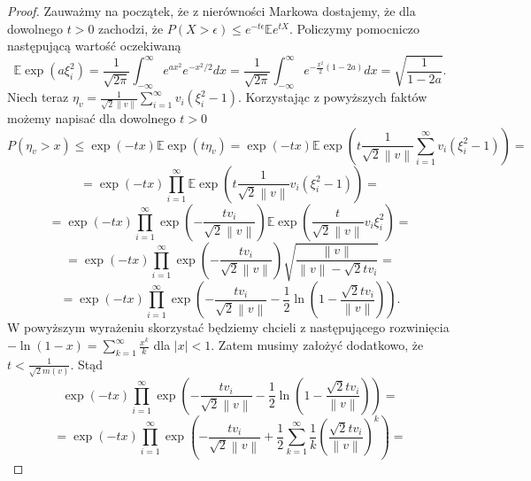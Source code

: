 \documentclass{article}
\newcommand{\norm}[1]{\left\lVert#1\right\rVert}
\begin{document}
\begin{proof}
Zauważmy na początek, że z nierówności Markowa dostajemy, że dla dowolnego $t>0$ zachodzi, że $P(X>\epsilon)\leq e^{-t\epsilon}\mathbb{E}e^{tX}$. Policzymy pomocniczo następującą wartość oczekiwaną
\begin{displaymath}
\mathbb{E}\exp (a\xi_i^2)=\frac{1}{\sqrt{2\pi}}\int_{-\infty}^{\infty}e^{ax^2}e^{-x^2/2}dx=\frac{1}{\sqrt{2\pi}}\int_{-\infty}^{\infty}e^{-\frac{x^2}{2}(1-2a)}dx=\sqrt{\frac{1}{1-2a}}.
\end{displaymath}
Niech teraz $\eta_v=\frac{1}{\sqrt{2}\norm{v}}\sum_{i=1}^{\infty}v_i(\xi_i^2-1)$. Korzystając z powyższych faktów możemy napisać dla dowolnego $t>0$
\begin{displaymath}
P(\eta_v>x)\leq \exp(-tx)\mathbb{E}\exp(t\eta_v)=\exp(-tx)\mathbb{E}\exp\left(t\frac{1}{\sqrt{2}\norm{v}}\sum_{i=1}^{\infty}v_i(\xi_i^2-1)\right)=
\end{displaymath}
\begin{displaymath}
=\exp(-tx)\prod_{i=1}^{\infty}\mathbb{E}\exp\left(t\frac{1}{\sqrt{2}\norm{v}}v_i(\xi_i^2-1)\right)=
\end{displaymath}
\begin{displaymath}
=\exp(-tx)\prod_{i=1}^{\infty}\exp\left(-\frac{tv_i}{\sqrt{2}\norm{v}}\right)\mathbb{E}\exp\left(\frac{t}{\sqrt{2}\norm{v}}v_i\xi_i^2\right)=
\end{displaymath}
\begin{displaymath}
=\exp(-tx)\prod_{i=1}^{\infty}\exp\left(-\frac{tv_i}{\sqrt{2}\norm{v}}\right)\sqrt{\frac{\norm{v}}{\norm{v}-\sqrt{2}tv_i}}=
\end{displaymath}
\begin{displaymath}
=\exp(-tx)\prod_{i=1}^{\infty}\exp\left(-\frac{tv_i}{\sqrt{2}\norm{v}}-\frac{1}{2}\ln\left(1-\frac{\sqrt{2}tv_i}{\norm{v}}\right)\right).
\end{displaymath}
W powyższym wyrażeniu skorzystać będziemy chcieli z następującego rozwinięcia $-\ln (1-x)=\sum_{k=1}^{\infty}\frac{x^k}{k}$ dla $|x|<1$. Zatem musimy założyć dodatkowo, że $t<\frac{1}{\sqrt{2}m(v)}$. Stąd
\begin{displaymath}
\exp(-tx)\prod_{i=1}^{\infty}\exp\left(-\frac{tv_i}{\sqrt{2}\norm{v}}-\frac{1}{2}\ln\left(1-\frac{\sqrt{2}tv_i}{\norm{v}}\right)\right)=
\end{displaymath}
\begin{displaymath}
=\exp(-tx)\prod_{i=1}^{\infty}\exp\left(-\frac{tv_i}{\sqrt{2}\norm{v}}+\frac{1}{2}\sum_{k=1}^{\infty}\frac{1}{k}\left(\frac{\sqrt{2}tv_i}{\norm{v}}\right)^k\right)=

\end{displaymath}
\end{proof}
\end{document}
